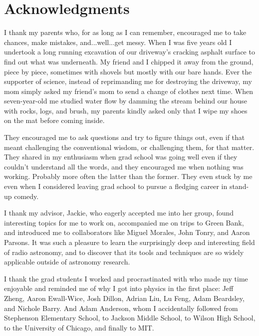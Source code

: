 % 

\cleardoublepage

\section*{Acknowledgments}

I thank my parents who, for as long as I can remember, encouraged me to take chances, make mistakes, and...well...get messy. When I was five years old I undertook a long running excavation of our driveway's cracking asphalt surface to find out what was underneath. My friend and I chipped it away from the ground, piece by piece, sometimes with shovels but mostly with our bare hands. Ever the supporter of science, instead of reprimanding me for destroying the driveway, my mom simply asked my friend's mom to send a change of clothes next time. When seven-year-old me studied water flow by damming the stream behind our house with rocks, logs, and brush, my parents kindly asked only that I wipe my shoes on the mat before coming inside. 

They encouraged me to ask questions and try to figure things out, even if that meant challenging the conventional wisdom, or challenging them, for that matter. They shared in my enthusiasm when grad school was going well even if they couldn't understand all the words, and they encouraged me when nothing was working. Probably more often the latter than the former. They even stuck by me even when I considered leaving grad school to pursue a fledging career in stand-up comedy.

I thank my advisor, Jackie, who eagerly accepted me into her group, found interesting topics for me to work on, accompanied me on trips to Green Bank, and introduced me to collaborators like Miguel Morales, John Tonry, and Aaron Parsons. It was such a pleasure to learn the surprisingly deep and interesting field of radio astronomy, and to discover that its tools and techniques are so widely applicable outside of astronomy research.

I thank the grad students I worked and procrastinated with who made my time enjoyable and reminded me of why I got into physics in the first place: Jeff Zheng, Aaron Ewall-Wice, Josh Dillon, Adrian Liu, Lu Feng, Adam Beardsley, and Nichole Barry. And Adam Anderson, whom I accidentally followed from Stephenson Elementary School, to Jackson Middle School, to Wilson High School, to the University of Chicago, and finally to MIT. 

